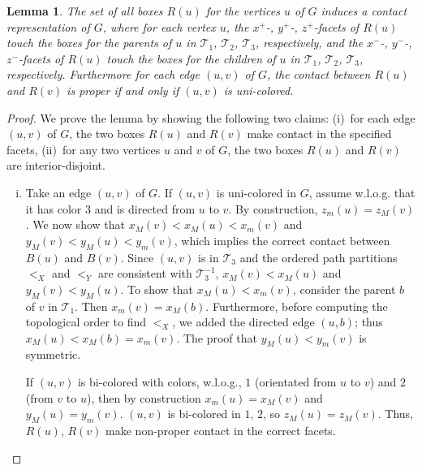 \documentclass{article}
\newtheorem{lemma}[theorem]{Lemma}
\newcommand{\TT}{{\mathcal{T}}}
\newcommand{\WLOG}{w.l.o.g.\xspace}
\begin{document}
\begin{lemma}
\label{lem:box-schny}
The set of all boxes $R(u)$ for the vertices $u$ of $G$ induces a contact representation of $G$, where
 for each vertex $u$, the $x^+$-, $y^+$-, $z^+$-facets of $R(u)$ touch the boxes for the parents of
 $u$ in $\TT_1$, $\TT_2$, $\TT_3$, respectively, and the $x^-$-, $y^-$-, $z^-$-facets of $R(u)$ touch
 the boxes for the children of $u$ in $\TT_1$, $\TT_2$, $\TT_3$, respectively. Furthermore for each
 edge $(u,v)$ of $G$, the contact between $R(u)$ and $R(v)$ is proper if and only if $(u,v)$ is uni-colored.
\end{lemma}
\begin{proof} We prove the lemma by showing the following two claims:
 (i)~for each edge $(u,v)$ of $G$, the two boxes $R(u)$ and $R(v)$ make contact in the specified facets,
 (ii)~for any two vertices $u$ and $v$ of $G$, the two boxes $R(u)$ and $R(v)$ are interior-disjoint.

\begin{enumerate}[(i)]
\item Take an edge $(u,v)$ of $G$. If $(u,v)$ is uni-colored in $G$, assume \WLOG that it has color 3 and is directed from $u$ to $v$.
 By construction, $z_m(u)=z_M(v)$. We now show that $x_M(v)<x_M(u)<x_m(v)$ and
 $y_M(v)<y_M(u)<y_m(v)$, which implies the correct contact between $B(u)$ and $B(v)$.
 Since $(u,v)$ is in $\TT_3$ and the ordered path partitions $<_X$ and $<_Y$ are consistent
 with $\TT_3^{-1}$, $x_M(v)<x_M(u)$ and $y_M(v)<y_M(u)$.
 To show that $x_M(u)<x_m(v)$, consider the parent $b$ of $v$ in $\TT_1$.
 Then $x_m(v)=x_M(b)$. Furthermore, before computing the topological order to find $<_X$, we added
 the directed edge $(u,b)$; thus $x_M(u)<x_M(b)=x_m(v)$. The proof that $y_M(u)<y_m(v)$ is symmetric.

 If $(u,v)$ is bi-colored with colors, \WLOG, $1$ (orientated from $u$ to $v$) and $2$ (from $v$ to $u$),
 then by construction $x_m(u)=x_M(v)$ and $y_M(u)=y_m(v)$. 
 $(u,v)$ is bi-colored in $1$, $2$, so $z_M(u)=z_M(v)$. Thus, $R(u)$, $R(v)$ make
 non-proper contact in the correct facets.


\end{enumerate}
\end{proof}
\end{document}
